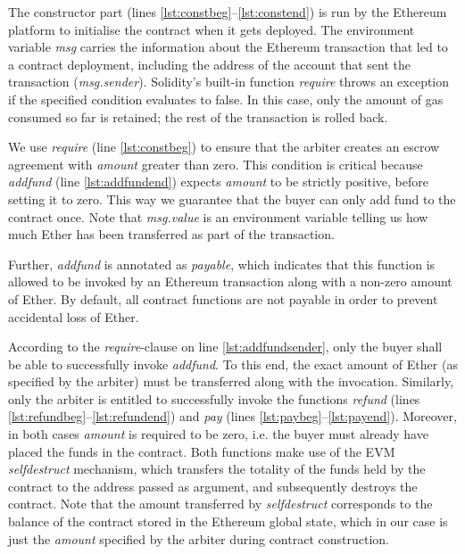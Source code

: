 \documentclass[sigplan,10pt]{acmart}\settopmatter{printfolios=true,printccs=false,printacmref=false}
\begin{document}
The constructor part (lines \autoref{lst:constbeg}--\autoref{lst:constend})
is run by the Ether\-eum platform to initialise the contract when it gets deployed.
The environment variable \textit{msg} carries the information
about the Ethereum transaction that led to a contract deployment, 
including the address of the account that
sent the transaction (\textit{msg.sender}).
Solidity's built-in function \textit{require} throws an exception
if the specified condition evaluates to false.
In this case, only the amount of gas consumed so far is retained;
the rest of the transaction is rolled back.

We use \textit{require} (line \ref{lst:constbeg}) to ensure that the arbiter creates
an escrow agreement with \textit{amount} greater than zero.
This condition is critical because \textit{addfund} (line \autoref{lst:addfundend})
expects \textit{amount} to be strictly positive,
before setting it to zero.
This way we guarantee that the buyer can only add fund to the contract once.
Note that \textit{msg.value} is an environment variable
telling us how much Ether has been transferred as part of the transaction.

Further, \textit{addfund} is annotated as \textit{payable},
which indicates that this function is allowed to be invoked
by an Ethereum transaction along with a non-zero amount of
Ether. By default, all contract functions are not payable
in order to prevent accidental loss of Ether.

According to the \textit{require}-clause on line \autoref{lst:addfundsender}, 
only the buyer shall be able to successfully invoke \textit{addfund}. To this end,
the exact amount of Ether (as specified by the arbiter) must be transferred
along with the invocation.
%
Similarly, only the arbiter is entitled to successfully invoke 
the functions \textit{refund} (lines \autoref{lst:refundbeg}--\autoref{lst:refundend})
and \textit{pay} (lines \autoref{lst:paybeg}--\autoref{lst:payend}). 
Moreover, in both cases \textit{amount} is required to be zero, i.e.
the buyer must already have placed the funds in the contract.
Both functions make use of the EVM \textit{selfdestruct} %
mechanism,
which transfers the totality of the funds held by the contract
to the address passed as argument, and subsequently destroys the contract.
Note that the amount transferred by \textit{selfdestruct} corresponds
to the balance of the contract stored in the Ethereum global state, which
in our case is just the \textit{amount} specified by the arbiter
during contract construction.
\end{document}
